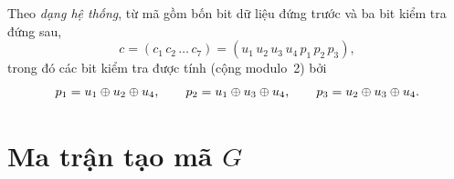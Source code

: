 Theo \emph{dạng hệ thống}, từ mã gồm bốn bit dữ liệu đứng trước và ba bit kiểm
tra đứng sau,
\begin{equation}
  c = (c_1\,c_2\,\dots\,c_7) = (u_1\,u_2\,u_3\,u_4\,p_1\,p_2\,p_3),
\end{equation}
trong đó các bit kiểm tra được tính (cộng modulo~2) bởi
\begin{equation}\label{eq:bitkiemtra}
  p_1 = u_1 \oplus u_2 \oplus u_4,\qquad
  p_2 = u_1 \oplus u_3 \oplus u_4,\qquad
  p_3 = u_2 \oplus u_3 \oplus u_4 .
\end{equation}

\section{Ma trận tạo mã \texorpdfstring{$G$}{G}}
\label{sec:1.5}

